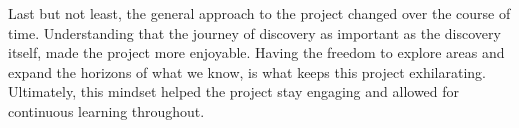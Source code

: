 Last but not least, the general approach to the project changed over the course of time.
Understanding that the journey of discovery as important as the discovery itself,
made the project more enjoyable. Having the freedom to explore areas and expand
the horizons of what we know, is what keeps this project exhilarating.
Ultimately, this mindset helped the project stay engaging and allowed for continuous learning throughout.





